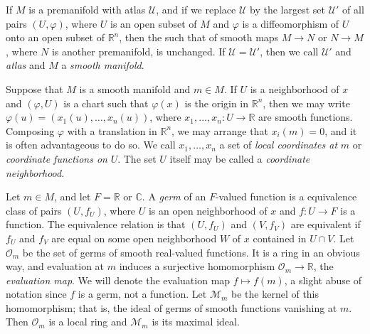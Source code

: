 \documentclass[12pt,reqno]{book}%
\theoremstyle{definition}
\theoremstyle{remark}
\theoremstyle{theorem}
\theoremstyle{remark}
\begin{document}
If $M$ is a premanifold with atlas $\mathcal{U}$, and if we replace $\mathcal{U}$ by the largest set $\mathcal{U}'$ of all pairs $(U, \varphi)$, where $U$ is an open subset of $M$ and $\varphi$ is a diffeomorphism of $U$ onto an open subset of $\mathbb{R}^{n}$, then the such that of smooth maps $M \to N$ or $N \to M$, where $N$ is another premanifold, is unchanged.
If $\mathcal{U} = \mathcal{U}'$, then we call $\mathcal{U}'$ and \emph{atlas} and $M$ a \emph{smooth manifold}.

Suppose that $M$ is a smooth manifold and $m \in M$.
If $U$ is a neighborhood of $x$ and $(\varphi, U)$ is a chart such that $\varphi(x)$ is the origin in $\mathbb{R}^{n}$, then we may write $\varphi(u) = (x_1(u), \ldots, x_n(u))$, where $x_1, \ldots, x_n : U \to \mathbb{R}$ are smooth functions.
Composing $\varphi$ with a translation in $\mathbb{R}^{n}$, we may arrange that $x_i(m) = 0$, and it is often advantageous to do so.
We call $x_1, \ldots, x_n$ a set of \emph{local coordinates at} $m$ or \emph{coordinate functions on} $U$.
The set $U$ itself may be called a \emph{coordinate neighborhood}.

Let $m \in M$, and let $F = \mathbb{R}$ or $\mathbb{C}$.
A \emph{germ} of an $F$-valued function is a equivalence class of pairs $(U, f_U)$, where $U$ is an open neighborhood of $x$ and $f : U \to F$ is a function.
The equivalence relation is that $(U, f_U)$ and $(V, f_V)$ are equivalent if $f_U$ and $f_V$ are equal on some open neighborhood $W$ of $x$ contained in $U \cap V$.
Let $\mathcal{O}_m$ be the set of germs of smooth real-valued functions.
It is a ring in an obvious way, and evaluation at $m$ induces a surjective homomorphism $\mathcal{O}_m \to \mathbb{R}$, the \emph{evaluation map}.
We will denote the evaluation map $f \mapsto f(m)$, a slight abuse of notation since $f$ is a germ, not a function.
Let $\mathcal{M}_m$ be the kernel of this homomorphism; that is, the ideal of germs of smooth functions vanishing at $m$.
Then $\mathcal{O}_m$ is a local ring and $\mathcal{M}_m$ is its maximal ideal.
\end{document}
